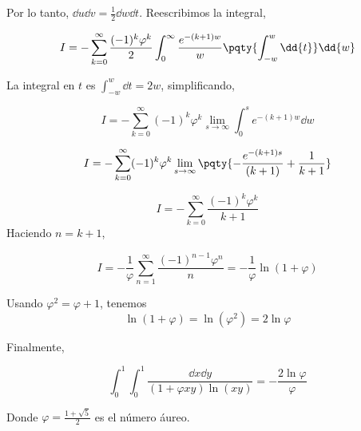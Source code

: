 {	Por lo tanto, $\dd{u}\dd{v} = \frac{1}{2}\dd{w}\dd{t}$. \; Reescribimos la integral, 
	 
	$$  
	I = - \sum_{k=0}^\infty \frac{(-1)^k \varphi^k}{2} \int_0^\infty \frac{e^{-(k+1)w}}{ w} \pqty{\int_{-w}^w \dd{t}} \dd{w} 
	$$  
	
	La integral en $t$ es $\displaystyle \int_{-w}^w \dd{t} = 2w$, \; simplificando, 
	 
	$$
	I= -\sum_{k=0}^\infty (-1)^k \varphi^k  \lim\limits_{s \to \infty} \int_0^s e^{-(k+1)w} \dd{w}
	$$  
	
	$$  
	I  =-\sum_{k=0}^\infty (-1)^k \varphi^k \lim\limits_{s \to \infty} \pqty{- \frac{ e^{-(k+1)s}}{(k+1)} +  \frac{1}{k+1} }  
	$$
	
	$$
	I=- \sum_{k=0}^\infty \frac{(-1)^k \varphi^k}{k + 1}  
	$$  
	Haciendo $n = k + 1$,   
	
	$$  
	I = -\frac{1}{\varphi} \sum_{n=1}^\infty \frac{(-1)^{n-1} \varphi^n}{n} =- \frac{1}{\varphi} \ln(1 + \varphi)  
	$$  
	
	Usando $\varphi^2 = \varphi + 1$, tenemos  
	$$  
	\ln(1 + \varphi) = \ln(\varphi^2) = 2\ln\varphi 
	$$  
	
	 Finalmente,   
	
	
}
\begin{LnxRptaBox} 
	\begin{equation*}
		   \int_0^1 \int_0^1 \frac{ \dd{x}\dd{y}}{(1 + \varphi xy) \ln (xy)}=-\frac{2\ln\varphi}{\varphi}  
	\end{equation*} 
\end{LnxRptaBox} 
Donde  \( \varphi = \frac{1+\sqrt{5}}{2} \) es el número áureo.
